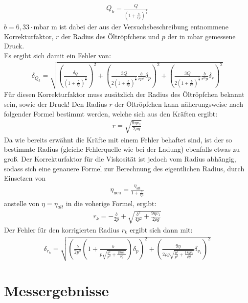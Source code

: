 \documentclass[12pt]{scrartcl}
\begin{document}
\begin{align}
Q_k = \frac{Q}{\left(1+\frac{b}{rp}\right)^{\frac{3}{2}}}
\label{eqn:q_r}
\end{align}
$ b = 6,33 \cdot \text{mbar m}$ ist dabei der aus der Versuchsbeschreibung entnommene Korrekturfaktor, $r$ der Radius des Öltröpfchens und $p$ der in mbar gemessene Druck.\\
Es ergibt sich damit ein Fehler von:
\begin{align}
\delta_{Q_k} = \sqrt{
\left(\frac{\delta_Q}{\left(1+\frac{b}{rp}\right)^{\frac{3}{2}}}\right)^2+
\left(\frac{3Q}{2\left(1+\frac{b}{rp}\right)^{\frac{5}{2}}}\frac{b}{rp^2}\delta_p\right)^2+
\left(\frac{3Q}{2\left(1+\frac{b}{rp}\right)^{\frac{5}{2}}}\frac{b}{r^2p}\delta_r\right)^2
}
\label{eqn:q_r_sigma}
\end{align}
Für diesen Korrekturfaktor muss zusätzlich der Radius des Öltröpfchen bekannt sein, sowie der Druck!
Den Radius $r$ der Öltröpfchen kann näherungsweise nach folgender Formel bestimmt werden, welche sich aus den Kräften ergibt:
\begin{align}
r = \sqrt{\frac{9\eta v_1}{2\rho g}}
\end{align}
Da wie bereits erwähnt die Kräfte mit einem Fehler behaftet sind, ist der so bestimmte Radius (gleiche Fehlerquelle wie bei der Ladung) ebenfalls etwas zu groß. Der Korrekturfaktor für die Viskosität ist jedoch vom Radius abhängig, sodass sich eine genauere Formel zur Berechnung des eigentlichen Radius, durch Einsetzen von 
\begin{align}
\eta_{\text{neu}} = \frac{\eta_{\text{alt}}}{1+\frac{b}{rp}}
\end{align} 
anstelle von $\eta = \eta_{alt}$ in die voherige Formel, ergibt:
\begin{align}
r_k = -\frac{b}{2p}+\sqrt{\frac{b^2}{4p^2}+\frac{9\eta v_1}{2\rho g}}
\end{align}
Der Fehler für den korrigierten Radius $r_k$ ergibt sich dann mit:
\begin{align}
\delta_{r_k} = \sqrt{
\left(\frac{b}{2p^2}\left(1+\frac{b}{p\sqrt{\frac{b^2}{p^2}+\frac{18\eta v_1}{\rho g}}}\right)\delta_p\right)^2+
\left(\frac{9\eta}{2\rho g\sqrt{\frac{b^2}{p^2}+\frac{18\eta v_1}{\rho g}}}\delta_{v_1}\right)^2}
\end{align}
\section{Messergebnisse}
\end{document}
